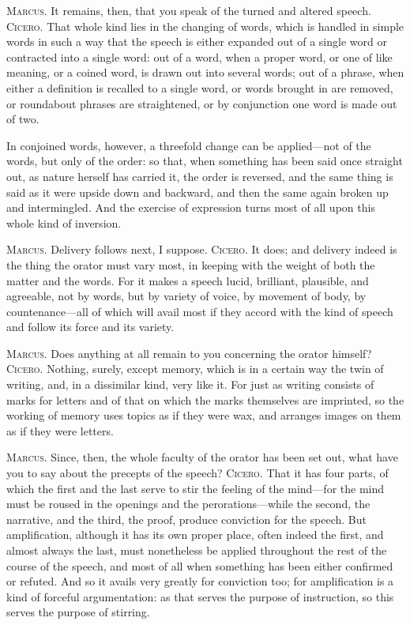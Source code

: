  \textsc{Marcus.} It remains, then, that you speak of the turned and altered speech. \textsc{Cicero.} That whole kind lies in the changing of words, which is handled in simple words in such a way that the speech is either expanded out of a single word or contracted into a single word: out of a word, when a proper word, or one of like meaning, or a coined word, is drawn out into several words; out of a phrase, when either a definition is recalled to a single word, or words brought in are removed, or roundabout phrases are straightened, or by conjunction one word is made out of two.

 In conjoined words, however, a threefold change can be applied—not of the words, but only of the order: so that, when something has been said once straight out, as nature herself has carried it, the order is reversed, and the same thing is said as it were upside down and backward, and then the same again broken up and intermingled. And the exercise of expression turns most of all upon this whole kind of inversion.

 \textsc{Marcus.} Delivery follows next, I suppose. \textsc{Cicero.} It does; and delivery indeed is the thing the orator must vary most, in keeping with the weight of both the matter and the words. For it makes a speech lucid, brilliant, plausible, and agreeable, not by words, but by variety of voice, by movement of body, by countenance—all of which will avail most if they accord with the kind of speech and follow its force and its variety.

 \textsc{Marcus.} Does anything at all remain to you concerning the orator himself? \textsc{Cicero.} Nothing, surely, except memory, which is in a certain way the twin of writing, and, in a dissimilar kind, very like it. For just as writing consists of marks for letters and of that on which the marks themselves are imprinted, so the working of memory uses topics as if they were wax, and arranges images on them as if they were letters.

 \textsc{Marcus.} Since, then, the whole faculty of the orator has been set out, what have you to say about the precepts of the speech? \textsc{Cicero.} That it has four parts, of which the first and the last serve to stir the feeling of the mind—for the mind must be roused in the openings and the perorations—while the second, the narrative, and the third, the proof, produce conviction for the speech. But amplification, although it has its own proper place, often indeed the first, and almost always the last, must nonetheless be applied throughout the rest of the course of the speech, and most of all when something has been either confirmed or refuted. And so it avails very greatly for conviction too; for amplification is a kind of forceful argumentation: as that serves the purpose of instruction, so this serves the purpose of stirring.

